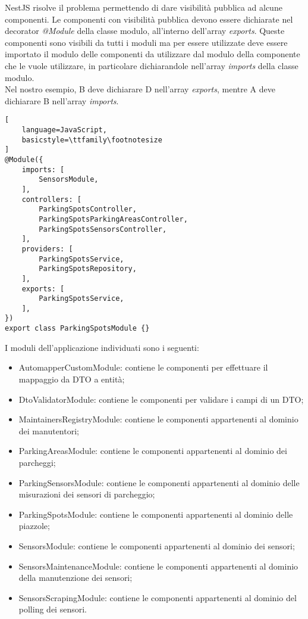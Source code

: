NestJS risolve il problema permettendo di dare visibilità pubblica ad alcune componenti.
Le componenti con visibilità pubblica devono essere dichiarate nel decorator \textit{@Module} della classe modulo, all'interno
dell'array \textit{exports}. Queste componenti sono visibili da tutti i moduli ma per essere utilizzate deve 
essere importato il modulo delle componenti da utilizzare dal modulo della componente che le vuole utilizzare, in particolare dichiarandole nell'array \textit{imports}
della classe modulo.
\\
Nel nostro esempio, B deve dichiarare D nell'array \textit{exports}, mentre A deve dichiarare B nell'array \textit{imports}.
\\
\begin{lstlisting}[
    language=JavaScript,
    basicstyle=\ttfamily\footnotesize
]
@Module({
    imports: [ 
        SensorsModule,
    ],
    controllers: [
        ParkingSpotsController, 
        ParkingSpotsParkingAreasController,
        ParkingSpotsSensorsController,
    ],
    providers: [
        ParkingSpotsService,
        ParkingSpotsRepository,
    ],
    exports: [
        ParkingSpotsService,
    ],
})
export class ParkingSpotsModule {}
\end{lstlisting}
\leavevmode\newline
I moduli dell'applicazione individuati sono i seguenti:
\begin{itemize}
    \item AutomapperCustomModule: contiene le componenti per effettuare il mappaggio da DTO a entità;
    \item DtoValidatorModule: contiene le componenti per validare i campi di un DTO;
    \item MaintainersRegistryModule: contiene le componenti appartenenti al dominio dei manutentori;
    \item ParkingAreasModule: contiene le componenti appartenenti al dominio dei parcheggi;
    \item ParkingSensorsModule: contiene le componenti appartenenti al dominio delle misurazioni dei sensori di parcheggio;
    \item ParkingSpotsModule: contiene le componenti appartenenti al dominio delle piazzole;
    \item SensorsModule: contiene le componenti appartenenti al dominio dei sensori;
    \item SensorsMaintenanceModule: contiene le componenti appartenenti al dominio della manutenzione dei sensori;
    \item SensorsScrapingModule: contiene le componenti appartenenti al dominio del polling dei sensori.
\end{itemize}
